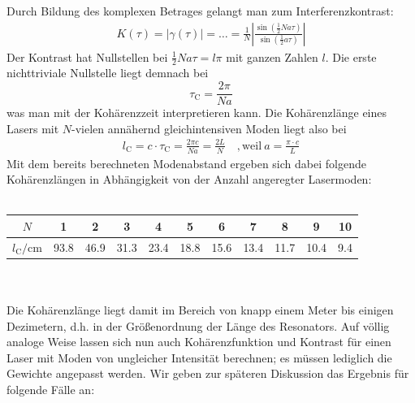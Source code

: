 \documentclass[german,  %
parskip=full,  %
]{scrartcl}
\begin{document}
Durch Bildung des komplexen Betrages gelangt man zum Interferenzkontrast:
\begin{align*}
K(\tau) = |\gamma(\tau)| = \hdots = \frac{1}{N} \left|\frac{\sin\left(\frac{1}{2}Na\tau\right) }{\sin\left(\frac{1}{2}a\tau\right) }\right|
\end{align*}
Der Kontrast hat Nullstellen bei \(\frac{1}{2}Na\tau = l\pi\) mit ganzen Zahlen \(l\). Die erste nichttriviale Nullstelle liegt demnach bei
\[\tau_{\mathrm{C}} = \frac{2\pi}{Na}\]
was man mit der Kohärenzzeit interpretieren kann. Die Kohärenzlänge eines Lasers mit \(N\)-vielen annähernd gleichintensiven Moden liegt also bei
\begin{align}
l_{\mathrm{C}} = c\cdot\tau_{\mathrm{C}} = \frac{2\pi c}{Na} = \frac{2L}{N} \quad , \text{weil} \  a = \frac{\pi\cdot c}{L} 
\end{align}
Mit dem bereits berechneten Modenabstand ergeben sich dabei folgende Kohärenzlängen in Abhängigkeit von der Anzahl angeregter Lasermoden: \\\\
\begin{table}[h!] \centering
\begin{tabular}{|c|c|c|c|c|c|c|c|c|c|c|}
\hline
\(N\) & 1 & 2 & 3 & 4 & 5 & 6 & 7 & 8 & 9 & 10\\\hline
\(l_{\mathrm{C}} \mathrm{/} \mathrm{cm}\) & 93.8 & 46.9 & 31.3 & 23.4 & 18.8 & 15.6 & 13.4 & 11.7 & 10.4 & 9.4 \\\hline
\end{tabular}
\end{table} \\\\
Die Kohärenzlänge liegt damit im Bereich von knapp einem Meter bis einigen Dezimetern, d.h. in der Größenordnung der Länge des Resonators. Auf völlig analoge Weise lassen sich nun auch Kohärenzfunktion und Kontrast für einen Laser mit Moden von ungleicher Intensität berechnen; es müssen lediglich die Gewichte angepasst werden. Wir geben zur späteren Diskussion das Ergebnis für folgende Fälle an:
\end{document}

